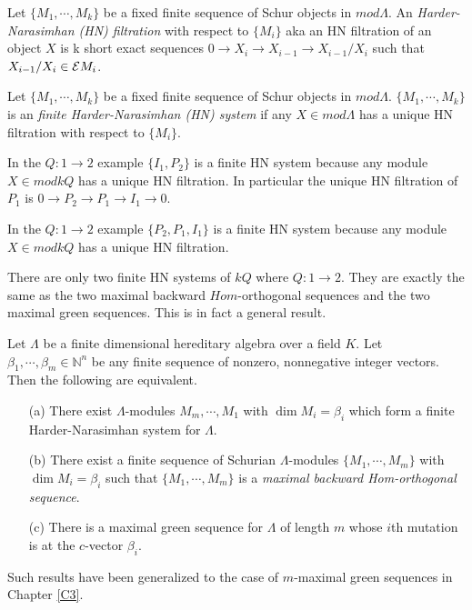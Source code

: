 \begin{definition}
Let $\{M_1,\cdots, M_k\}$ be a fixed finite sequence of Schur objects in $mod \Lambda$. An \textit{Harder-Narasimhan (HN) filtration} with respect to $\{M_i\}$ aka an HN filtration of an object $X$ is k short exact sequences $0\to X_i\to X_{i-1}\to X_{i-1}/X_i$ such that $X_{i-1}/X_i\in\mathcal{E}{M_i}$. 
\end{definition}
\begin{definition}
Let $\{M_1,\cdots, M_k\}$ be a fixed finite sequence of Schur objects in $mod \Lambda$. $\{M_1,\cdots, M_k\}$ is an \textit{finite Harder-Narasimhan (HN) system} if any $X\in mod \Lambda$ has a unique HN filtration with respect to $\{M_i\}$.
\end{definition}
\begin{example}
In the $Q:1\to 2$ example $\{I_1, P_2\}$ is a finite HN system because any module $X\in mod kQ$ has a unique HN filtration. In particular the unique HN filtration of $P_1$ is $0\to P_2\to P_1\to I_1\to 0$.
\end{example}
\begin{example}
In the $Q:1\to 2$ example $\{P_2, P_1, I_1\}$ is a finite HN system because any module $X\in mod kQ$ has a unique HN filtration.
\end{example}
\indent There are only two finite HN systems of $kQ$ where $Q:1\to 2$. They are exactly the same as the two maximal backward $Hom$-orthogonal sequences and the two maximal green sequences. This is in fact a general result.\\
\begin{theorem}
\cite{I17} Let $\Lambda$ be a finite dimensional hereditary algebra over a field $K$. Let $\beta_1,\cdots,\beta_m\in \mathbb{N}^n$ be any finite sequence of nonzero, nonnegative integer vectors. Then the following are equivalent.\label{thm:3}
\begin{enumerate}
\item[(a)] There exist $\Lambda$-modules $M_m,\cdots,M_1$ with $\dim M_i=\beta_i$ which form a finite Harder-Narasimhan system for $\Lambda$. 
\item[(b)] There exist a finite sequence of Schurian $\Lambda$-modules $\{M_1,\cdots,M_m\}$ with $\dim M_i=\beta_i$ such that $\{M_1,\cdots,M_m\}$ is a \textit{maximal backward Hom-orthogonal sequence}.
\item[(c)] There is a maximal green sequence for $\Lambda$ of length $m$ whose $i$th mutation is at the $c$-vector $\beta_i$. 
\end{enumerate}
\end{theorem}
\indent Such results have been generalized to the case of $m$-maximal green sequences in Chapter \ref{C3}.

